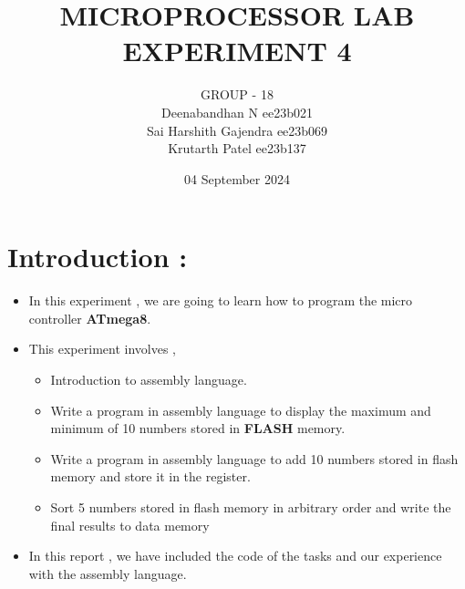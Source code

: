 \documentclass{article}
\title{MICROPROCESSOR LAB EXPERIMENT 4}
\author{GROUP - 18 \\ Deenabandhan N ee23b021 \\ Sai Harshith Gajendra ee23b069 \\ Krutarth Patel ee23b137}
\date{04 September 2024}
\begin{document}
\maketitle

\section*{Introduction :}
\begin{itemize}
    \item In this experiment , we are going to learn how to program the micro controller \textbf{ATmega8}.
    \item This experiment involves ,
    \begin{itemize}
        \item Introduction to assembly language.
        \item Write a program in assembly language to display the maximum and minimum of 10 numbers stored in \textbf{FLASH} memory.
        \item Write a program in assembly language to add 10 numbers stored in flash memory and store it in the register.
        \item Sort 5 numbers stored in flash memory in arbitrary order and write the final results to data memory
    \end{itemize}
    \item In this report , we have included the code of the tasks and our experience with the assembly language. 
\end{itemize}
\end{document}
